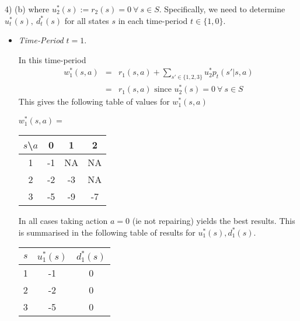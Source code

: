 \documentclass[11pt,a4paper]{article}
\begin{document}
\begin{answer}{4) (b)}
  where $u_2^*(s):=r_2(s)=0\ \forall\ s\in S$. Specifically, we need to determine $u_t^*(s),\ d_t^*(s)$ for all states $s$ in each time-period $t\in\{1,0\}$.
  \begin{itemize}
    \item \textit{Time-Period} $t=1$.
    \par In this time-period
    \[\begin{array}{rcl}
      w_1^*(s,a)&=&r_1(s,a)+\sum_{s'\in\{1,2,3\}}u_2^*p_t(s'|s,a)\\
                &=&r_1(s,a)\text{ since }u_{2}^*(s)=0\ \forall\ s\in S
    \end{array}\]
    This gives the following table of values for $w_1^*(s,a)$
    \begin{center}
      $w_1^*(s,a)=$
      \begin{tabular}{c|ccc}
        $s$\textbackslash $a$&0&1&2\\\hline
        1&-1&NA&NA\\
        2&-2&-3&NA\\
        3&-5&-9&-7
      \end{tabular}
    \end{center}
    In all cases taking action $a=0$ (ie not repairing) yields the best results. This is summarised in the following table of results for $u_1^*(s),d_1^*(s)$.
    \begin{center}
      \begin{tabular}{c|c|c}
        $s$&$u_1^*(s)$&$d_1^*(s)$\\\hline
        1&-1&0\\
        2&-2&0\\
        3&-5&0
      \end{tabular}
    \end{center}


\end{itemize}
\end{answer}
\end{document}
